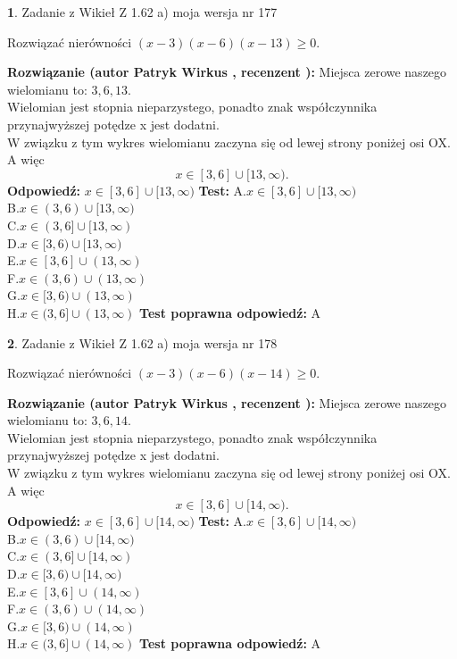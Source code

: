 \documentclass[12pt, a4paper]{article}
\theoremstyle{definition} %
\newtheorem{zad}{}
\newcommand{\zadStart}[1]{\begin{zad}#1\newline}
\newcommand{\zadStop}{\end{zad}}
\newcommand{\rozwStart}[2]{\noindent \textbf{Rozwiązanie (autor #1 , recenzent #2): }\newline}
\newcommand{\rozwStop}{\newline}
\newcommand{\odpStart}{\noindent \textbf{Odpowiedź:}\newline}
\newcommand{\odpStop}{\newline}
\newcommand{\testStart}{\noindent \textbf{Test:}\newline}
\newcommand{\testStop}{\newline}
\newcommand{\kluczStart}{\noindent \textbf{Test poprawna odpowiedź:}\newline}
\newcommand{\kluczStop}{\newline}
\begin{document}
\zadStart{Zadanie z Wikieł Z 1.62 a) moja wersja nr 177}

Rozwiązać nierówności $(x-3)(x-6)(x-13)\ge0$.
\zadStop
\rozwStart{Patryk Wirkus}{}
Miejsca zerowe naszego wielomianu to: $3, 6, 13$.\\
Wielomian jest stopnia nieparzystego, ponadto znak współczynnika przy\linebreak najwyższej potędze x jest dodatni.\\ W związku z tym wykres wielomianu zaczyna się od lewej strony poniżej osi OX. A więc $$x \in [3,6] \cup [13,\infty).$$
\rozwStop
\odpStart
$x \in [3,6] \cup [13,\infty)$
\odpStop
\testStart
A.$x \in [3,6] \cup [13,\infty)$\\
B.$x \in (3,6) \cup [13,\infty)$\\
C.$x \in (3,6] \cup [13,\infty)$\\
D.$x \in [3,6) \cup [13,\infty)$\\
E.$x \in [3,6] \cup (13,\infty)$\\
F.$x \in (3,6) \cup (13,\infty)$\\
G.$x \in [3,6) \cup (13,\infty)$\\
H.$x \in (3,6] \cup (13,\infty)$
\testStop
\kluczStart
A
\kluczStop



\zadStart{Zadanie z Wikieł Z 1.62 a) moja wersja nr 178}

Rozwiązać nierówności $(x-3)(x-6)(x-14)\ge0$.
\zadStop
\rozwStart{Patryk Wirkus}{}
Miejsca zerowe naszego wielomianu to: $3, 6, 14$.\\
Wielomian jest stopnia nieparzystego, ponadto znak współczynnika przy\linebreak najwyższej potędze x jest dodatni.\\ W związku z tym wykres wielomianu zaczyna się od lewej strony poniżej osi OX. A więc $$x \in [3,6] \cup [14,\infty).$$
\rozwStop
\odpStart
$x \in [3,6] \cup [14,\infty)$
\odpStop
\testStart
A.$x \in [3,6] \cup [14,\infty)$\\
B.$x \in (3,6) \cup [14,\infty)$\\
C.$x \in (3,6] \cup [14,\infty)$\\
D.$x \in [3,6) \cup [14,\infty)$\\
E.$x \in [3,6] \cup (14,\infty)$\\
F.$x \in (3,6) \cup (14,\infty)$\\
G.$x \in [3,6) \cup (14,\infty)$\\
H.$x \in (3,6] \cup (14,\infty)$
\testStop
\kluczStart
A
\kluczStop
\end{document}
